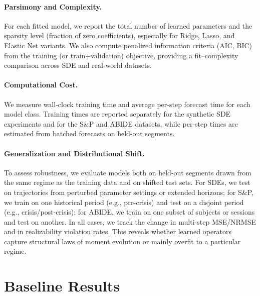\documentclass[journal, onecolumn]{IEEEtran}
\begin{document}
\paragraph{Parsimony and Complexity.}
For each fitted model, we report the total number of learned parameters and the
sparsity level (fraction of zero coefficients), especially for Ridge, Lasso,
and Elastic Net variants. We also compute penalized information criteria (AIC,
BIC) from the training (or train+validation) objective, providing a
fit–complexity comparison across SDE and real-world datasets.

\paragraph{Computational Cost.}
We measure wall-clock training time and average per-step forecast time for each
model class. Training times are reported separately for the synthetic SDE
experiments and for the S\&P and ABIDE datasets, while per-step times are
estimated from batched forecasts on held-out segments.

\paragraph{Generalization and Distributional Shift.}
To assess robustness, we evaluate models both on held-out segments drawn from
the same regime as the training data and on shifted test sets. For SDEs, we
test on trajectories from perturbed parameter settings or extended horizons;
for S\&P, we train on one historical period (e.g., pre-crisis) and test on a
disjoint period (e.g., crisis/post-crisis); for ABIDE, we train on one subset of
subjects or sessions and test on another. In all cases, we track the change in
multi-step MSE/NRMSE and in realizability violation rates. This reveals whether
learned operators capture structural laws of moment evolution or mainly
overfit to a particular regime.

 

\section{Baseline Results}
\label{sec:baseline-results}
\end{document}

